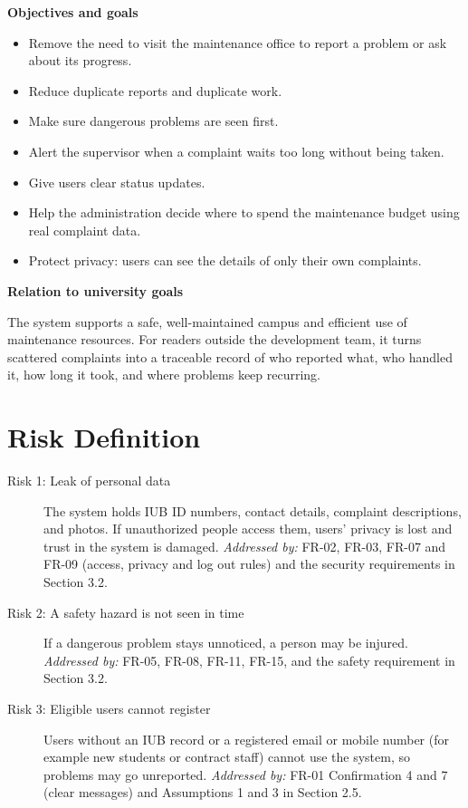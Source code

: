 \textbf{Objectives and goals}

\begin{itemize}
  \item Remove the need to visit the maintenance office to report a problem or ask about its progress.
  \item Reduce duplicate reports and duplicate work.
  \item Make sure dangerous problems are seen first.
  \item Alert the supervisor when a complaint waits too long without being taken.
  \item Give users clear status updates.
  \item Help the administration decide where to spend the maintenance budget using real complaint data.
  \item Protect privacy: users can see the details of only their own complaints.
\end{itemize}

\textbf{Relation to university goals}

The system supports a safe, well-maintained campus and efficient use of maintenance resources. For readers outside the development team, it turns scattered complaints into a traceable record of who reported what, who handled it, how long it took, and where problems keep recurring.

\section{Risk Definition}
\begin{description}
  \item[Risk 1: Leak of personal data] The system holds IUB ID numbers, contact details, complaint descriptions, and photos. If unauthorized people access them, users' privacy is lost and trust in the system is damaged. \textit{Addressed by:} FR-02, FR-03, FR-07 and FR-09 (access, privacy and log out rules) and the security requirements in Section 3.2.
  \item[Risk 2: A safety hazard is not seen in time] If a dangerous problem stays unnoticed, a person may be injured. \textit{Addressed by:} FR-05, FR-08, FR-11, FR-15, and the safety requirement in Section 3.2.
  \item[Risk 3: Eligible users cannot register] Users without an IUB record or a registered email or mobile number (for example new students or contract staff) cannot use the system, so problems may go unreported. \textit{Addressed by:} FR-01 Confirmation 4 and 7 (clear messages) and Assumptions 1 and 3 in Section 2.5.
\end{description}

